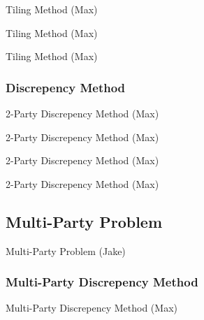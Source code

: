 \documentclass{beamer}
\begin{document}
\begin{frame}{Tiling Method (Max)}

\end{frame}

\begin{frame}{Tiling Method (Max)}

\end{frame}

\begin{frame}{Tiling Method (Max)}

\end{frame}

\subsubsection{Discrepency Method}

\begin{frame}{2-Party Discrepency Method (Max)}

\end{frame}

\begin{frame}{2-Party Discrepency Method (Max)}

\end{frame}

\begin{frame}{2-Party Discrepency Method (Max)}

\end{frame}

\begin{frame}{2-Party Discrepency Method (Max)}

\end{frame}

\subsection{Multi-Party Problem}

\begin{frame}{Multi-Party Problem (Jake)}
\TODO
\end{frame}

\subsubsection{Multi-Party Discrepency Method}

\begin{frame}{Multi-Party Discrepency Method (Max)}
\TODO
\end{frame}
\end{document}
